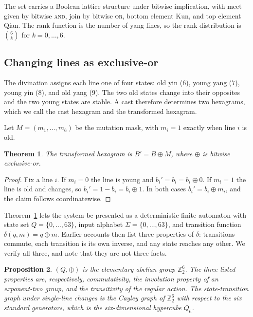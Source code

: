 \documentclass[11pt,a4paper]{article}
\newtheorem{theorem}{Theorem}
\newtheorem{proposition}[theorem]{Proposition}
\newcommand{\Ztwo}{\mathbb{Z}_2}
\newcommand{\Qsix}{Q_6}
\newcommand{\xor}{\oplus}
\begin{document}
The set carries a Boolean lattice structure under bitwise implication, with meet
given by bitwise \textsc{and}, join by bitwise \textsc{or}, bottom element Kun,
and top element Qian. The rank function is the number of yang lines, so the rank
distribution is $\binom{6}{k}$ for $k = 0,\dots,6$.

\subsection{Changing lines as exclusive-or}
\label{sec:automaton}

The divination assigns each line one of four states: old yin ($6$), young yang
($7$), young yin ($8$), and old yang ($9$). The two old states change into their
opposites and the two young states are stable. A cast therefore determines two
hexagrams, which we call the cast hexagram and the transformed hexagram.

Let $M = (m_1,\dots,m_6)$ be the mutation mask, with $m_i = 1$ exactly when line
$i$ is old.

\begin{theorem}
\label{thm:xor}
The transformed hexagram is $B' = B \xor M$, where $\xor$ is bitwise
exclusive-or.
\end{theorem}

\begin{proof}
Fix a line $i$. If $m_i = 0$ the line is young and $b_i' = b_i = b_i \xor 0$. If
$m_i = 1$ the line is old and changes, so $b_i' = 1 - b_i = b_i \xor 1$. In both
cases $b_i' = b_i \xor m_i$, and the claim follows coordinatewise.
\end{proof}

Theorem~\ref{thm:xor} lets the system be presented as a deterministic finite
automaton with state set $Q = \{0,\dots,63\}$, input alphabet
$\Sigma = \{0,\dots,63\}$, and transition function $\delta(q,m) = q \xor m$.
Earlier accounts then list three properties of $\delta$: transitions commute,
each transition is its own inverse, and any state reaches any other. We verify
all three, and note that they are not three facts.

\begin{proposition}
\label{prop:group}
$(Q, \xor)$ is the elementary abelian group $\Ztwo^6$. The three listed
properties are, respectively, commutativity, the involution property of an
exponent-two group, and the transitivity of the regular action. The
state-transition graph under single-line changes is the Cayley graph of
$\Ztwo^6$ with respect to the six standard generators, which is the
six-dimensional hypercube $\Qsix$.
\end{proposition}
\end{document}
